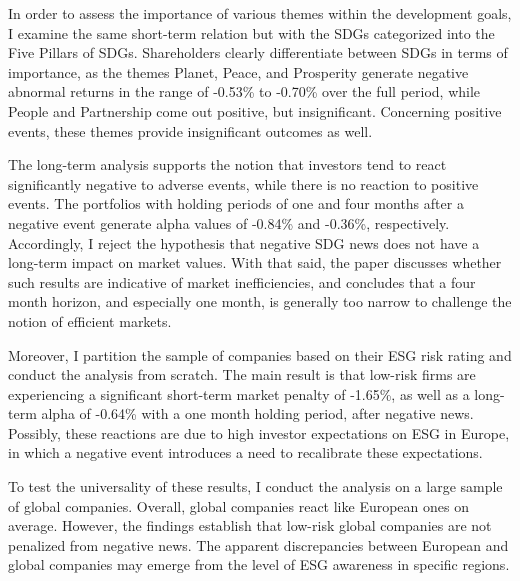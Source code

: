 In order to assess the importance of various themes within the development goals, I examine the same short-term relation but with the SDGs categorized into the Five Pillars of SDGs. Shareholders clearly differentiate between SDGs in terms of importance, as the themes Planet, Peace, and Prosperity generate negative abnormal returns in the range of -0.53\% to -0.70\% over the full period, while People and Partnership come out positive, but insignificant. Concerning positive events, these themes provide insignificant outcomes as well. 

The long-term analysis supports the notion that investors tend to react significantly negative to adverse events, while there is no reaction to positive events. The portfolios with holding periods of one and four months after a negative event generate alpha values of -0.84\% and -0.36\%, respectively. Accordingly, I reject the hypothesis that negative SDG news does not have a long-term impact on market values. With that said, the paper discusses whether such results are indicative of market inefficiencies, and concludes that a four month horizon, and especially one month, is generally too narrow to challenge the notion of efficient markets. 

Moreover, I partition the sample of companies based on their ESG risk rating and conduct the analysis from scratch. The main result is that low-risk firms are experiencing a significant short-term market penalty of -1.65\%, as well as a long-term alpha of -0.64\% with a one month holding period, after negative news. Possibly, these reactions are due to high investor expectations on ESG in Europe, in which a negative event introduces a need to recalibrate these expectations.

To test the universality of these results, I conduct the analysis on a large sample of global companies. Overall, global companies react like European ones on average. However, the findings establish that low-risk global companies are not penalized from negative news. The apparent discrepancies between European and global companies may emerge from the level of ESG awareness in specific regions.  



